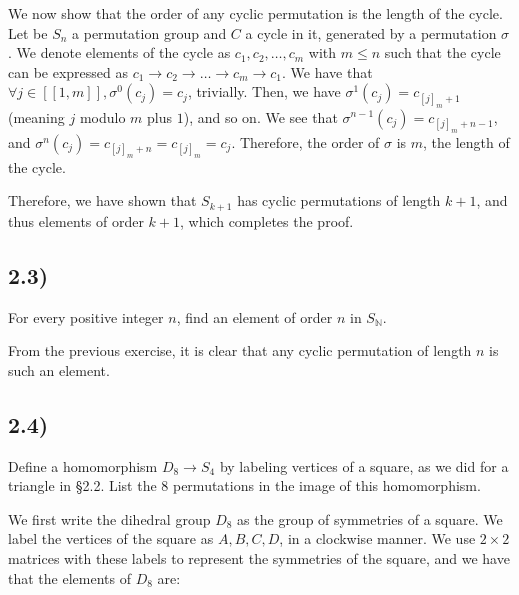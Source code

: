 \documentclass[12pt, letterpaper, twoside]{report}
\begin{document}
We now show that the order of any cyclic permutation is the length of the cycle. Let be $S_n$ a permutation group and $C$ a cycle in it, generated by a permutation $\sigma$. We denote elements of the cycle as $c_1, c_2, \ldots, c_m$ with $m \leq n$ such that the cycle can be expressed as $c_1 \rightarrow c_2 \rightarrow \ldots \rightarrow c_m \rightarrow c_1$. We have that $\forall j \in [[1, m]], \sigma^0(c_j) = c_j$, trivially. Then, we have $\sigma^1(c_j) = c_{[j]_m + 1}$ (meaning $j$ modulo $m$ plus $1$), and so on. We see that $\sigma^{n-1}(c_j) = c_{[j]_m + n-1}$, and $\sigma^n(c_j) = c_{[j]_m + n} = c_{[j]_m} = c_j$. Therefore, the order of $\sigma$ is $m$, the length of the cycle.

Therefore, we have shown that $S_{k+1}$ has cyclic permutations of length $k+1$, and thus elements of order $k+1$, which completes the proof.


\subsection*{2.3)}

For every positive integer $n$, find an element of order $n$ in $S_\mathbb{N}$.

From the previous exercise, it is clear that any cyclic permutation of length $n$ is such an element.


\subsection*{2.4)}

Define a homomorphism $D_8 \to S_4$ by labeling vertices of a square, as we did for a triangle in §2.2. List the 8 permutations in the image of this homomorphism.

We first write the dihedral group $D_8$ as the group of symmetries of a square. We label the vertices of the square as $A, B, C, D$, in a clockwise manner. We use $2\times2$ matrices with these labels to represent the symmetries of the square, and we have that the elements of $D_8$ are:
\end{document}
